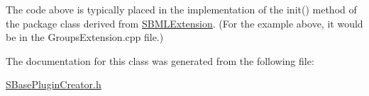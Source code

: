 The code above is typically placed in the implementation of the {\ttfamily init()} method of the package class derived from \hyperlink{class_s_b_m_l_extension}{S\+B\+M\+L\+Extension}. (For the example above, it would be in the {\ttfamily Groups\+Extension.\+cpp} file.) 

The documentation for this class was generated from the following file\+:\begin{DoxyCompactItemize}
\item 
\hyperlink{_s_base_plugin_creator_8h}{S\+Base\+Plugin\+Creator.\+h}\end{DoxyCompactItemize}
